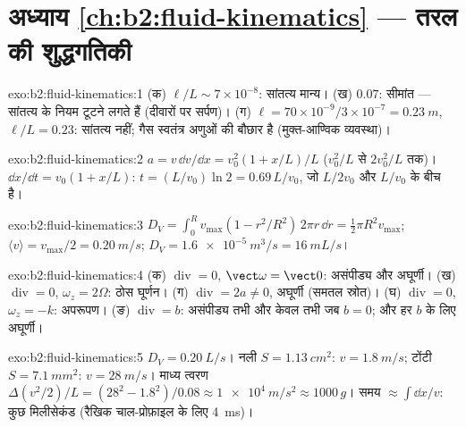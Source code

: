 \section*{अध्याय \ref{ch:b2:fluid-kinematics} --- तरल की शुद्धगतिकी}

\begin{solution}{exo:b2:fluid-kinematics:1}
(क) $\ell/L \sim 7 \times 10^{-8}$: सांतत्य मान्य। (ख) $0.07$: सीमांत ---
सांतत्य के नियम टूटने लगते हैं (दीवारों पर सर्पण)। (ग) $\ell = 70 \times 10^{-9}
/3 \times 10^{-7} = \qty{0.23}{m}$, $\ell/L = 0.23$: सांतत्य नहीं; गैस
स्वतंत्र अणुओं की बौछार है (मुक्त-आण्विक व्यवस्था)।
\end{solution}

\begin{solution}{exo:b2:fluid-kinematics:2}
$a = v\,\dd v/\dd x = v_0^2(1 + x/L)/L$ ($v_0^2/L$ से $2v_0^2/L$ तक)।
$\dd x/\dd t = v_0(1 + x/L)$: $t = (L/v_0)\ln2 = 0.69\,L/v_0$, जो
$L/2v_0$ और $L/v_0$ के बीच है।
\end{solution}

\begin{solution}{exo:b2:fluid-kinematics:3}
$D_V = \int_0^Rv_{\max}(1 - r^2/R^2)\,2\pi r\,\dd r = \tfrac12\pi R^2v_{\max}$;
$\langle v\rangle = v_{\max}/2 = \qty{0.20}{m/s}$; $D_V = \qty{1.6e-5}{m^3/s} =
\qty{16}{mL/s}$।
\end{solution}

\begin{solution}{exo:b2:fluid-kinematics:4}
(क) $\operatorname{div} = 0$, $\vect\omega = \vect 0$: असंपीड्य और
अघूर्णी। (ख) $\operatorname{div} = 0$, $\omega_z = 2\Omega$: ठोस
घूर्णन। (ग) $\operatorname{div} = 2a \ne 0$, अघूर्णी (समतल
स्रोत)। (घ) $\operatorname{div} = 0$, $\omega_z = -k$: अपरूपण। (ङ)
$\operatorname{div} = b$: असंपीड्य तभी और केवल तभी जब $b = 0$; और हर
$b$ के लिए अघूर्णी।
\end{solution}

\begin{solution}{exo:b2:fluid-kinematics:5}
$D_V = \qty{0.20}{L/s}$। नली $S = \qty{1.13}{cm^2}$: $v = \qty{1.8}{m/s}$; टोंटी
$S = \qty{7.1}{mm^2}$: $v = \qty{28}{m/s}$। माध्य त्वरण $\Delta(v^2/2)/L
= (28^2 - 1.8^2)/0.08 \approx \qty{1e4}{m/s^2} \approx 1000\,g$। समय $\approx
\int\dd x/v$: कुछ मिलीसेकंड (रैखिक चाल-प्रोफ़ाइल के लिए \qty{4}{ms})।
\end{solution}

